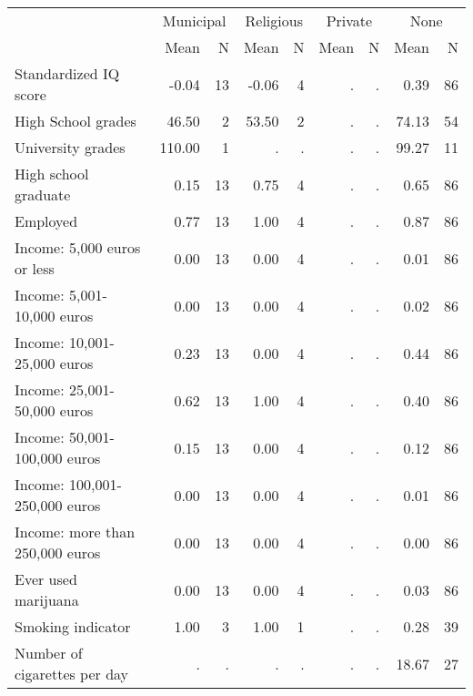 \begin{tabular}{l r r r r r r r r}
\toprule
& \multicolumn{2}{c}{Municipal} & \multicolumn{2}{c}{Religious} & \multicolumn{2}{c}{Private} & \multicolumn{2}{c}{None} \\
& \scriptsize Mean & \scriptsize N & \scriptsize Mean & \scriptsize N & \scriptsize Mean & \scriptsize N & \scriptsize Mean & \scriptsize N \\
\midrule
Standardized IQ score &     -0.04 &        13 &     -0.06 &         4 &         . & . &      0.39 &        86 \\
High School grades &     46.50 &         2 &     53.50 &         2 &         . & . &     74.13 &        54 \\
University grades &    110.00 &         1 &         . & . &         . & . &     99.27 &        11 \\
High school graduate &      0.15 &        13 &      0.75 &         4 &         . & . &      0.65 &        86 \\
Employed &      0.77 &        13 &      1.00 &         4 &         . & . &      0.87 &        86 \\
Income: 5,000 euros or less &      0.00 &        13 &      0.00 &         4 &         . & . &      0.01 &        86 \\
Income: 5,001-10,000 euros &      0.00 &        13 &      0.00 &         4 &         . & . &      0.02 &        86 \\
Income: 10,001-25,000 euros &      0.23 &        13 &      0.00 &         4 &         . & . &      0.44 &        86 \\
Income: 25,001-50,000 euros &      0.62 &        13 &      1.00 &         4 &         . & . &      0.40 &        86 \\
Income: 50,001-100,000 euros &      0.15 &        13 &      0.00 &         4 &         . & . &      0.12 &        86 \\
Income: 100,001-250,000 euros &      0.00 &        13 &      0.00 &         4 &         . & . &      0.01 &        86 \\
Income: more than 250,000 euros &      0.00 &        13 &      0.00 &         4 &         . & . &      0.00 &        86 \\
Ever used marijuana &      0.00 &        13 &      0.00 &         4 &         . & . &      0.03 &        86 \\
Smoking indicator &      1.00 &         3 &      1.00 &         1 &         . & . &      0.28 &        39 \\
Number of cigarettes per day &         . & . &         . & . &         . & . &     18.67 &        27 \\

\end{tabular}
